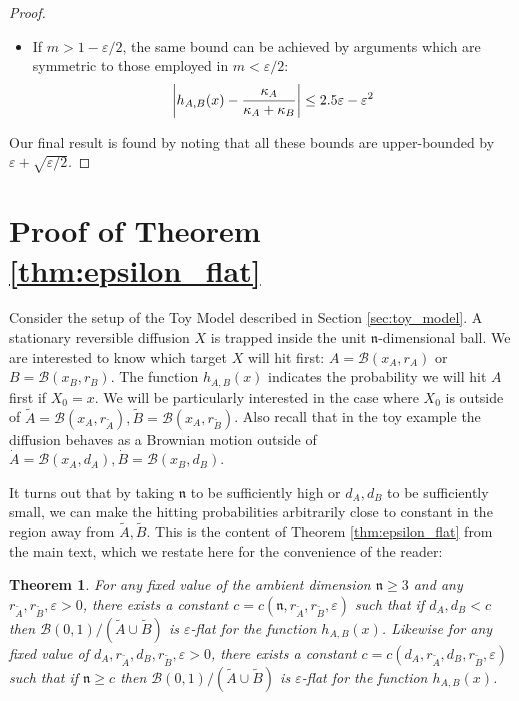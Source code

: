 \documentclass[english, aip, jcp, priprint, graphicx,floatfix]{revtex4-1}
\newtheorem{theorem}{Theorem}
\theoremstyle{plain}
\theoremstyle{definition}
\theoremstyle{plain}
\newcommand{\dimension}{{\mathfrak{n}}}
\newcommand{\bb}[1]{\mathcal{B}\left(#1\right)}
\begin{document}
\begin{proof}
\begin{itemize}
    \item If $m>1-\varepsilon/2$, the same bound can be achieved by arguments which are symmetric to those employed in $m<\varepsilon/2$:
    \[
    \left|h_{A,B}(x) -  \frac{\kappa_A}{\kappa_A + \kappa_B}\right| \leq 2.5\varepsilon -\varepsilon^2
    \]
\end{itemize}
Our final result is found by noting that all these bounds are upper-bounded by $\varepsilon + \sqrt{\varepsilon/2}$.
\end{proof}

           

\section{Proof of Theorem \ref{thm:epsilon_flat}}\label{sec:proof_epsilon_flat}

Consider the setup of the Toy Model described in Section \ref{sec:toy_model}.  A stationary reversible diffusion $X$ is trapped inside the unit $\dimension$-dimensional ball.  We are interested to know which target $X$ will hit first: $A=\bb{x_A,r_A}$ or $B=\bb{x_B,r_B}$.  The function $h_{A,B}(x)$ indicates the probability we will hit $A$ first if $X_0=x$.  We will be particularly interested in the case where $X_0$ is outside of $\tilde A=\bb{x_A,r_{\tilde A}},\tilde B=\bb{x_A,r_{\tilde B}}$.  Also recall that in the toy example the diffusion behaves as a Brownian motion outside of $\dot A=\bb{x_A,d_A},\dot B=\bb{x_B,d_B}$.  

It turns out that by taking $\dimension$ to be sufficiently high or $d_A,d_B$ to be sufficiently small, we can make the hitting probabilities arbitrarily close to constant in the region away from $\tilde A,\tilde B$.  This is the content of Theorem \ref{thm:epsilon_flat} from the main text, which we restate here for the convenience of the reader:

\begingroup
\def\thetheorem{\ref{thm:epsilon_flat}}
\begin{theorem}  For any fixed value of the ambient dimension $\dimension \geq 3$ and any $r_{\tilde{A}}, r_{\tilde{B}}, \varepsilon > 0$, there exists a constant $c=c(\dimension, r_{\tilde{A}}, r_{\tilde{B}}, \varepsilon)$ such that if $d_{A}, d_{B} < c$ then $\bb {0, 1} / (\tilde{A} \cup \tilde{B})$ is $\varepsilon$-flat for the function $h_{A,B}(x)$.  Likewise for any fixed value of $d_{A}, r_{\tilde{A}}, d_{B}, r_{\tilde{B}}, \varepsilon>0$, there exists a constant $c=c(d_{A}, r_{\tilde{A}}, d_{B}, r_{\tilde{B}}, \varepsilon)$ such that if $\dimension \geq c$ then $\bb {0, 1} / (\tilde{A} \cup \tilde{B})$ is $\varepsilon$-flat for the function $h_{A,B}(x)$.
\end{theorem}
\addtocounter{theorem}{-1}
\endgroup
\end{document}
